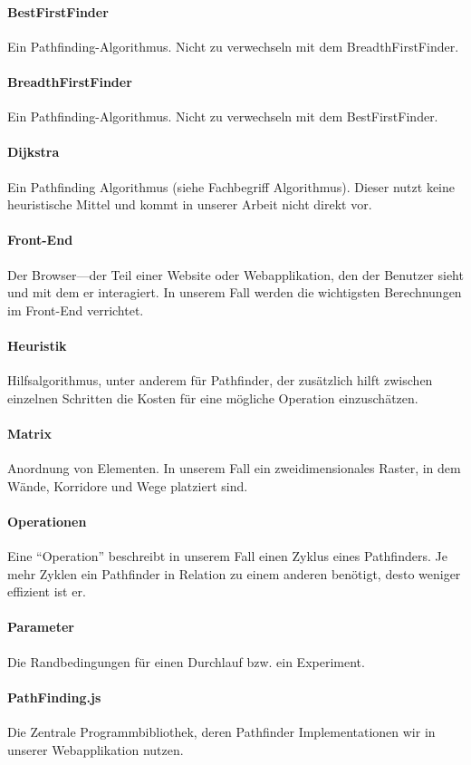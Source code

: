 \paragraph{BestFirstFinder} Ein Pathfinding-Algorithmus. Nicht zu verwechseln mit dem BreadthFirstFinder.
\paragraph{BreadthFirstFinder} Ein Pathfinding-Algorithmus. Nicht zu verwechseln mit dem BestFirstFinder.
\paragraph{Dijkstra} Ein Pathfinding Algorithmus (siehe Fachbegriff Algorithmus). Dieser nutzt keine heuristische Mittel und kommt in unserer Arbeit nicht direkt vor.
\paragraph{Front-End} Der Browser---der Teil einer Website oder Webapplikation, den der Benutzer sieht und mit dem er interagiert. In unserem Fall werden die wichtigsten Berechnungen im Front-End verrichtet.
\paragraph{Heuristik} Hilfsalgorithmus, unter anderem für Pathfinder, der zusätzlich hilft zwischen einzelnen Schritten die Kosten für eine mögliche Operation einzuschätzen.
\paragraph{Matrix} Anordnung von Elementen. In unserem Fall ein zweidimensionales Raster, in dem Wände, Korridore und Wege platziert sind.
\paragraph{Operationen} Eine ``Operation'' beschreibt in unserem Fall einen Zyklus eines Pathfinders. Je mehr Zyklen ein Pathfinder in Relation zu einem anderen benötigt, desto weniger effizient ist er.
\paragraph{Parameter} Die Randbedingungen für einen Durchlauf bzw. ein Experiment.
\paragraph{PathFinding.js} Die Zentrale Programmbibliothek, deren Pathfinder Implementationen wir in unserer Webapplikation nutzen.
